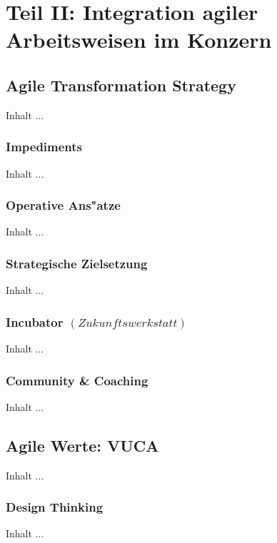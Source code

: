 
\chapter{Teil II: Integration agiler Arbeitsweisen im Konzern}
\minitoc 
\vspace{1 cm} 

\section{Agile Transformation Strategy}
Inhalt ...

\subsection{Impediments}
Inhalt ...

\subsection{Operative Ans"atze}
Inhalt ...

\subsection{Strategische Zielsetzung}
Inhalt ...

\subsection{Incubator $(Zukunftswerkstatt)$}
Inhalt ...

\subsection{Community \& Coaching}
Inhalt ...


\section{Agile Werte: VUCA}
Inhalt ...

\subsection{Design Thinking}
Inhalt ...

